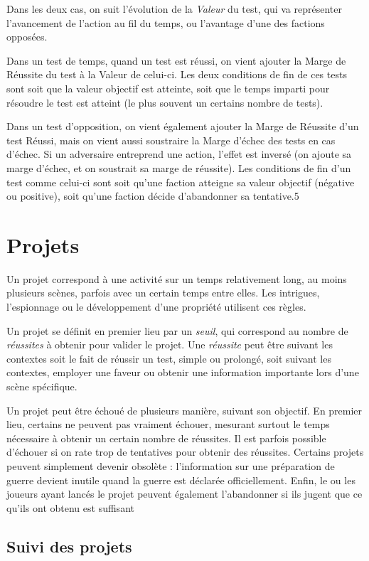\documentclass[10pt,a4paper]{book}
\begin{document}
\begin{multicols}{2}
Dans les deux cas, on suit l'évolution de la \emph{Valeur} du test, qui va représenter l'avancement de l'action au fil du temps, ou l'avantage d'une des factions opposées.

Dans un test de temps, quand un test est réussi, on vient ajouter la Marge de Réussite du test à la Valeur de celui-ci. Les deux conditions de fin de ces tests sont soit que la valeur objectif est atteinte, soit que le temps imparti pour résoudre le test est atteint (le plus souvent un certains nombre de tests).

Dans un test d'opposition, on vient également ajouter la Marge de Réussite d'un test Réussi, mais on vient aussi soustraire la Marge d'échec des tests en cas d'échec. Si un adversaire entreprend une action, l'effet est inversé (on ajoute sa marge d'échec, et on soustrait sa marge de réussite). Les conditions de fin d'un test comme celui-ci sont soit qu'une faction atteigne sa valeur objectif (négative ou positive), soit qu'une faction décide d'abandonner sa tentative.5
\section{Projets}
Un projet correspond à une activité sur un temps relativement long, au moins plusieurs scènes, parfois avec un certain temps entre elles. Les intrigues, l'espionnage ou le développement d'une propriété utilisent ces règles.

Un projet se définit en premier lieu par un \emph{seuil}, qui correspond au nombre de \emph{réussites} à obtenir pour valider le projet. Une \emph{réussite} peut être suivant les contextes soit le fait de réussir un test, simple ou prolongé, soit suivant les contextes, employer une faveur ou obtenir une information importante lors d'une scène spécifique.

Un projet peut être échoué de plusieurs manière, suivant son objectif. En premier lieu, certains ne peuvent pas vraiment échouer, mesurant surtout le temps nécessaire à obtenir un certain nombre de réussites. Il est parfois possible d'échouer si on rate trop de tentatives pour obtenir des réussites. Certains projets peuvent simplement devenir obsolète : l'information sur une préparation de guerre devient inutile quand la guerre est déclarée officiellement. Enfin, le ou les joueurs ayant lancés le projet peuvent également l'abandonner si ils jugent que ce qu'ils ont obtenu est suffisant
\subsection{Suivi des projets}

\end{multicols}
\end{document}
